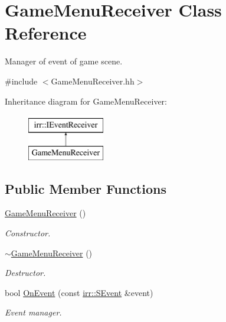 \hypertarget{classGameMenuReceiver}{}\section{Game\+Menu\+Receiver Class Reference}
\label{classGameMenuReceiver}


Manager of event of game scene.  




{\ttfamily \#include $<$Game\+Menu\+Receiver.\+hh$>$}

Inheritance diagram for Game\+Menu\+Receiver\+:\begin{figure}[H]
\begin{center}
\leavevmode
\includegraphics[height=2.000000cm]{classGameMenuReceiver}
\end{center}
\end{figure}
\subsection*{Public Member Functions}
\begin{DoxyCompactItemize}
\item 
\hyperlink{classGameMenuReceiver_a5dd735dbdeddd9f11a999c9f0c4210e8}{Game\+Menu\+Receiver} ()
\begin{DoxyCompactList}\small\item\em Constructor. \end{DoxyCompactList}\item 
\hyperlink{classGameMenuReceiver_a490afacab72bebb8b1f28c3977f9ed44}{$\sim$\+Game\+Menu\+Receiver} ()
\begin{DoxyCompactList}\small\item\em Destructor. \end{DoxyCompactList}\item 
bool \hyperlink{classGameMenuReceiver_af6774556abc7e3718b7bf904cc62ead0}{On\+Event} (const \hyperlink{structirr_1_1SEvent}{irr\+::\+S\+Event} \&event)
\begin{DoxyCompactList}\small\item\em Event manager. \end{DoxyCompactList}\end{DoxyCompactItemize}


